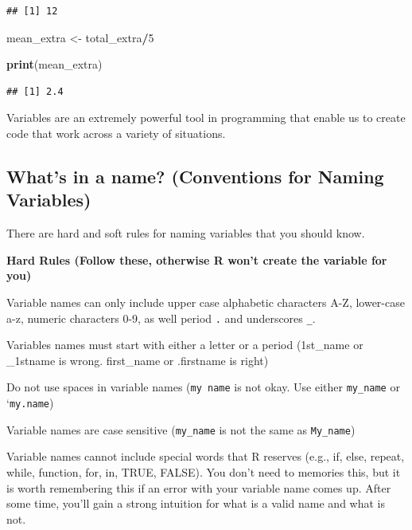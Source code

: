 \documentclass[
]{book}
\newenvironment{Shaded}{\begin{snugshade}}{\end{snugshade}}
\newcommand{\DecValTok}[1]{\textcolor[rgb]{0.00,0.00,0.81}{#1}}
\newcommand{\FunctionTok}[1]{\textcolor[rgb]{0.13,0.29,0.53}{\textbf{#1}}}
\newcommand{\NormalTok}[1]{#1}
\newcommand{\OtherTok}[1]{\textcolor[rgb]{0.56,0.35,0.01}{#1}}
\newcommand{\SpecialCharTok}[1]{\textcolor[rgb]{0.81,0.36,0.00}{\textbf{#1}}}
\begin{document}
\begin{verbatim}
## [1] 12
\end{verbatim}

\begin{Shaded}
\begin{Highlighting}[]
\NormalTok{mean\_extra }\OtherTok{\textless{}{-}}\NormalTok{  total\_extra}\SpecialCharTok{/}\DecValTok{5}

\FunctionTok{print}\NormalTok{(mean\_extra)}
\end{Highlighting}
\end{Shaded}

\begin{verbatim}
## [1] 2.4
\end{verbatim}

Variables are an extremely powerful tool in programming that enable us to create code that work across a variety of situations.

\hypertarget{whats-in-a-name-conventions-for-naming-variables}{%
\subsection{What's in a name? (Conventions for Naming Variables)}\label{whats-in-a-name-conventions-for-naming-variables}}

There are hard and soft rules for naming variables that you should know.

\textbf{Hard Rules (Follow these, otherwise R won't create the variable for you)}

Variable names can only include upper case alphabetic characters A-Z, lower-case a-z, numeric characters 0-9, as well period \texttt{.} and underscores \texttt{\_}.

Variables names must start with either a letter or a period (1st\_name or \_1stname is wrong. first\_name or .firstname is right)

Do not use spaces in variable names (\texttt{my\ name} is not okay. Use either \texttt{my\_name} or `\texttt{my.name})

Variable names are case sensitive (\texttt{my\_name} is not the same as \texttt{My\_name})

Variable names cannot include special words that R reserves (e.g., if, else, repeat, while, function, for, in, TRUE, FALSE). You don't need to memories this, but it is worth remembering this if an error with your variable name comes up. After some time, you'll gain a strong intuition for what is a valid name and what is not.
\end{document}
